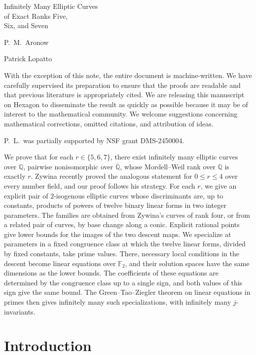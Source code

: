 \documentclass[12pt,oneside,openany]{book}
\theoremstyle{definition}
\theoremstyle{plain}
\numberwithin{equation}{chapter}
\theoremstyle{plain}
\theoremstyle{definition}
\theoremstyle{remark}
\newcommand{\npptitlepage}[2]{%
  \hypersetup{pageanchor=false}%
  \begin{titlepage}
  \centering\normalfont
  \vspace*{1.7in}
  {\large\strut\par}
  \vspace{1.05in}
  {\fontsize{28}{35}\selectfont #1\par}
  \vspace{1.1in}
  {\Large\def\\{\par\vspace{10pt}}#2\par}
  \vfill
  \end{titlepage}%
  \hypersetup{pageanchor=true}}
\newcommand{\Q}{\mathbb Q}
\newcommand{\F}{\mathbb F}
\newcommand{\Qbar}{\overline{\mathbb Q}}
\begin{document}
\frontmatter
\npptitlepage{Infinitely Many Elliptic Curves\\ of Exact Ranks Five,\\ Six, and Seven}{P.\ M.\ Aronow\\ Patrick Lopatto}
\begin{authorsnote}
With the exception of this note, the entire
document is machine-written. We have carefully supervised its preparation
to ensure that the proofs are readable and that
previous literature is appropriately cited. We are
releasing this manuscript on Hexagon to disseminate the result as quickly as
possible because it may be of interest to the mathematical
community. 
We welcome suggestions concerning mathematical corrections, omitted citations, and attribution of ideas.

P.\ L.\ was partially supported by NSF grant DMS-2450004.
\end{authorsnote}
\begin{abstractpage}
We prove that for each $r\in\{5,6,7\}$, there exist infinitely many elliptic curves over $\Q$, pairwise nonisomorphic over $\Qbar$, whose Mordell--Weil rank over $\Q$ is exactly $r$. Zywina recently proved the analogous statement for $0\le r\le 4$ over every number field, and our proof follows his strategy. For each $r$, we give an explicit pair of $2$-isogenous elliptic curves whose discriminants are, up to constants, products of powers of twelve binary linear forms in two integer parameters. The families are obtained from Zywina's curves of rank four, or from a related pair of curves, by base change along a conic. Explicit rational points give lower bounds for the images of the two descent maps. We specialize at parameters in a fixed congruence class at which the twelve linear forms, divided by fixed constants, take prime values. There, necessary local conditions in the descent become linear equations over $\F_2$, and their solution spaces have the same dimensions as the lower bounds. The coefficients of these equations are determined by the congruence class up to a single sign, and both values of this sign give the same bound. The Green--Tao--Ziegler theorem on linear equations in primes then gives infinitely many such specializations, with infinitely many $j$-invariants.
\end{abstractpage}
\tableofcontents
\mainmatter

\chapter{Introduction}\label{sec:introduction}
\end{document}
